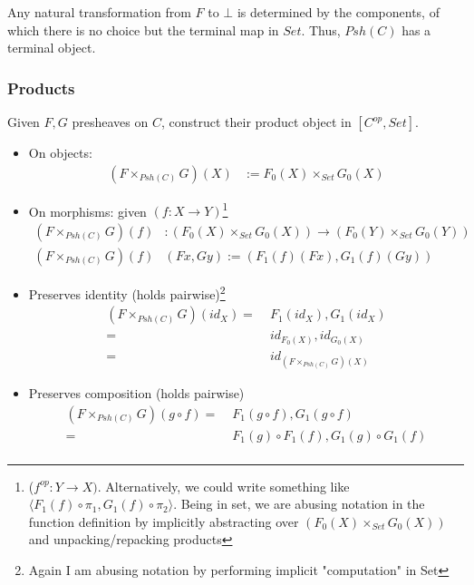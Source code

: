 \documentclass{article}
\begin{document}
        Any natural transformation from $F$ to $\bot$ is determined by the components, of which there is no choice but the terminal map in $Set$. Thus, $Psh(C)$ has a terminal object.

\subsubsection{Products}
Given $F,G$ presheaves on $C$, construct their product object in $[C^{op},Set]$.

    \begin{itemize}
        \item[] On objects:
            \begin{align*}
                (F \times_{Psh(C)} G) (X) &:= F_0 (X) \times_{Set} G_0 (X) 
            \end{align*}
        \item[] On morphisms: given $(f : X \rightarrow Y)$\footnote{($f^{op} : Y \rightarrow X)$. Alternatively, we could write something like $\langle F_1 (f) \circ \pi_1, G_1 (f) \circ \pi_2 \rangle$. Being in set, we are abusing notation in the function definition by implicitly abstracting over $(F_0 (X) \times_{Set} G_0 (X))$ and unpacking/repacking products }
        \begin{align*}
            (F \times_{Psh(C)} G)(f)&: (F_0 (X) \times_{Set} G_0 (X)) \rightarrow (F_0 (Y) \times_{Set} G_0 (Y)) \\
            (F \times_{Psh(C)} G)(f)&(Fx ,Gy) := (F_1(f)(Fx) , G_1(f)(Gy))
        \end{align*} 
        
    
        \item[] Preserves identity (holds pairwise)\footnote{Again I am abusing notation by performing implicit "computation" in Set}
        \begin{align*}
            (F \times_{Psh(C)} G)(id_X) =&\; F_1 (id_X) , G_1 (id_X)\\
            =&\; id_{F_0(X)}, id_{G_0(X)}\\
            =&\; id_{(F \times_{Psh(C)} G)(X)}
        \end{align*}
        \item[] Preserves composition (holds pairwise)
        \begin{align*}
            (F \times_{Psh(C)} G)(g \circ f) =&\; F_1 (g \circ f) , G_1 (g \circ f)\\
            =&\; F_1(g) \circ F_1(f), G_1(g) \circ G_1(f)\\
        \end{align*}
    \end{itemize}
\end{document}
